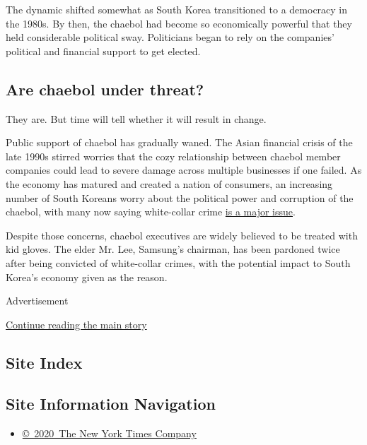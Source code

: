 The dynamic shifted somewhat as South Korea transitioned to a democracy
in the 1980s. By then, the chaebol had become so economically powerful
that they held considerable political sway. Politicians began to rely on
the companies' political and financial support to get elected.

\hypertarget{are-chaebol-under-threat}{%
\subsection{Are chaebol under threat?}\label{are-chaebol-under-threat}}

They are. But time will tell whether it will result in change.

Public support of chaebol has gradually waned. The Asian financial
crisis of the late 1990s stirred worries that the cozy relationship
between chaebol member companies could lead to severe damage across
multiple businesses if one failed. As the economy has matured and
created a nation of consumers, an increasing number of South Koreans
worry about the political power and corruption of the chaebol, with many
now saying white-collar crime
\href{https://www.nytimes.com/2016/07/05/business/dealbook/south-korea-targets-executives-pressed-by-an-angry-public.html}{is
a major issue}.

Despite those concerns, chaebol executives are widely believed to be
treated with kid gloves. The elder Mr. Lee, Samsung's chairman, has been
pardoned twice after being convicted of white-collar crimes, with the
potential impact to South Korea's economy given as the reason.

Advertisement

\protect\hyperlink{after-bottom}{Continue reading the main story}

\hypertarget{site-index}{%
\subsection{Site Index}\label{site-index}}

\hypertarget{site-information-navigation}{%
\subsection{Site Information
Navigation}\label{site-information-navigation}}

\begin{itemize}
\tightlist
\item
  \href{https://help.nytimes.com/hc/en-us/articles/115014792127-Copyright-notice}{©~2020~The
  New York Times Company}
\end{itemize}

